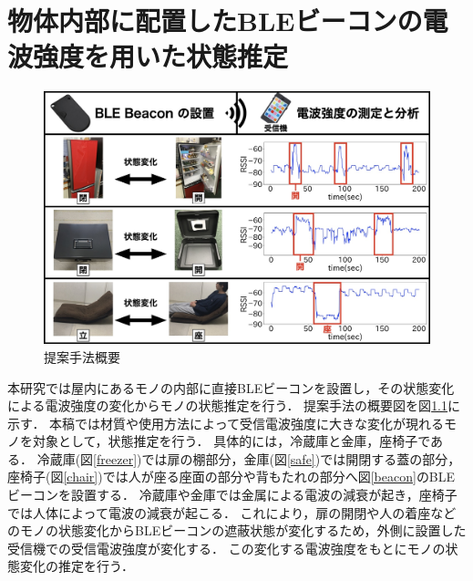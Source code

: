 \chapter{物体内部に配置したBLEビーコンの電波強度を用いた状態推定}
\thispagestyle{myheadings}

\begin{figure}[tbh]
    \centering
    \includegraphics[width=14cm]{images/chapter3/abst.jpg}
    \caption{提案手法概要}
    \label{abst-chap3}
\end{figure}

本研究では屋内にあるモノの内部に直接BLEビーコンを設置し，その状態変化による電波強度の変化からモノの状態推定を行う．
提案手法の概要図を図\ref{abst-chap3}に示す．
本稿では材質や使用方法によって受信電波強度に大きな変化が現れるモノを対象として，状態推定を行う．
具体的には，冷蔵庫と金庫，座椅子である．
冷蔵庫(図\ref{freezer})では扉の棚部分，金庫(図\ref{safe})では開閉する蓋の部分，座椅子(図\ref{chair})では人が座る座面の部分や背もたれの部分へ図\ref{beacon}のBLEビーコンを設置する．
冷蔵庫や金庫では金属による電波の減衰が起き，座椅子では人体によって電波の減衰が起こる．
これにより，扉の開閉や人の着座などのモノの状態変化からBLEビーコンの遮蔽状態が変化するため，外側に設置した受信機での受信電波強度が変化する．
この変化する電波強度をもとにモノの状態変化の推定を行う．


